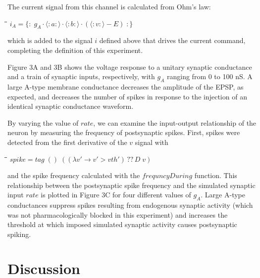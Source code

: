\documentclass[11pt]{article}
\newlength{\lwidth}\setlength{\lwidth}{4.5cm}
\newlength{\cwidth}\setlength{\cwidth}{8mm} %
\newcommand{\Conid}[1]{\mathit{#1}}
\newcommand{\Varid}[1]{\mathit{#1}}
\begin{document}
The current signal from this channel is calculated from Ohm's law:
\begin{tabbing}
\qquad\=\hspace{\lwidth}\=\hspace{\cwidth}\=\+\kill
${i_{A}\mathrel{=}\{\!:\!\;g_{A}\!\cdot\!\langle:\Varid{a}:\rangle\!\cdot\!\langle:\Varid{b}:\rangle\!\cdot\!(\langle:\Varid{v}:\rangle\mathbin{-}\Conid{E})\;\!:\!\}}$
\end{tabbing}which is added to the signal \ensuremath{\Varid{i}} defined above that drives the current
command, completing the definition of this experiment. 

Figure 3A and 3B shows the voltage response to a unitary synaptic
conductance and a train of synaptic inputs, respectively, with
\ensuremath{g_{A}} ranging from 0 to 100 nS. A large A-type membrane conductance
decreases the amplitude of the EPSP, as expected, and decreases the
number of spikes in response to the injection of an identical synaptic
conductance waveform.

By varying the value of \ensuremath{\Varid{rate}}, we can examine the input-output
relationship of the neuron by measuring the frequency of postsynaptic
spikes. First, spikes were detected from the first derivative of the
\ensuremath{\Varid{v}} signal with
\begin{tabbing}
\qquad\=\hspace{\lwidth}\=\hspace{\cwidth}\=\+\kill
${\Varid{spike}\mathrel{=}\Varid{tag}\;()\;((\lambda \Varid{v'}\to \Varid{v'}\mathbin{>}\Varid{vth'})\,??\,\Conid{D}\;\Varid{v})}$
\end{tabbing}and the spike frequency calculated with the \ensuremath{\Varid{frequncyDuring}} function.
This relationship between the postsynaptic spike frequency and the
simulated synaptic input \ensuremath{\Varid{rate}} is plotted in Figure 3C for four
different values of \ensuremath{g_{A}}. Large A-type conductances suppress spikes
resulting from endogenous synaptic activity (which was not
pharmacologically blocked in this experiment) and increases the
threshold at which imposed simulated synaptic activity causes postsynaptic
spiking.

\section*{Discussion}
\end{document}
